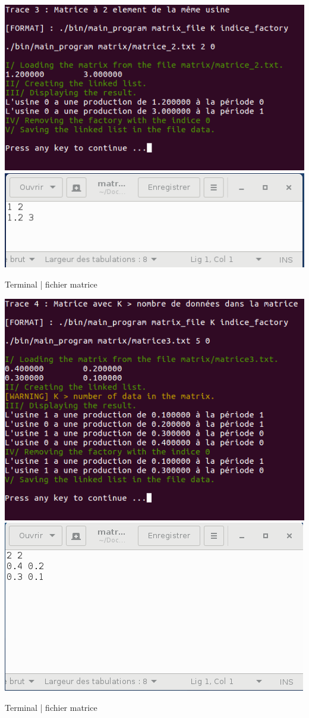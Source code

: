 \documentclass[a4paper]{article}
\begin{document}
\begin{center}
\includegraphics[scale=0.4]{trace_4.png}
\includegraphics[scale=0.4]{matrice_ligne.png}

Terminal | fichier matrice
\end{center}
\begin{center}
\includegraphics[scale=0.4]{trace_5.png}
\includegraphics[scale=0.4]{matrice_2.png}

Terminal | fichier matrice
\end{center}
\end{document}
